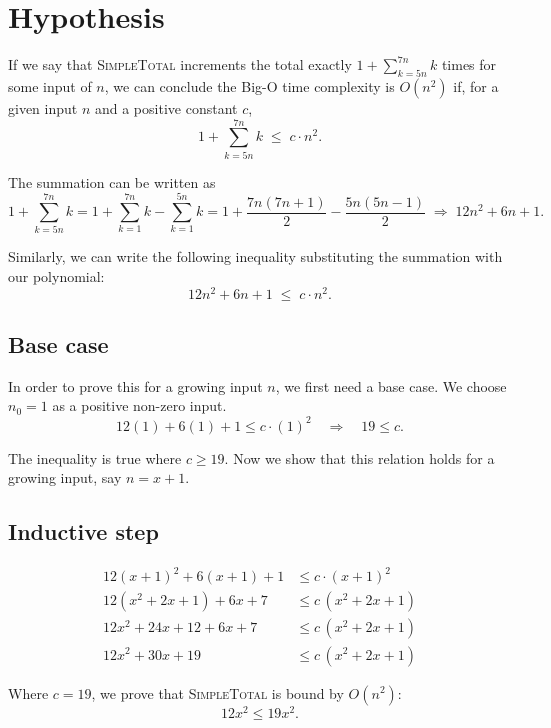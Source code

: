 \documentclass{article}
\begin{document}
\section*{Hypothesis}

If we say that \textsc{SimpleTotal} increments the total exactly
$1 + \sum_{k=5n}^{7n} k$ times for some input of $n$, we can conclude the
Big-O time complexity is $O(n^2)$ if, for a given input $n$ and a positive
constant $c$,
\[
  1 + \sum_{k=5n}^{7n} k \;\le\; c \cdot n^2.
\]

The summation can be written as
\[
  1 + \sum_{k=5n}^{7n} k
  = 1 + \sum_{k=1}^{7n} k - \sum_{k=1}^{5n} k
  = 1 + \frac{7n(7n+1)}{2} - \frac{5n(5n-1)}{2}
  \;\Rightarrow\; 12n^2 + 6n + 1.
\]

Similarly, we can write the following inequality substituting the summation
with our polynomial:
\[
  12n^2 + 6n + 1 \;\le\; c \cdot n^2.
\]

\subsection*{Base case}

In order to prove this for a growing input $n$, we first need a base case.
We choose $n_0 = 1$ as a positive non-zero input.
\[
  12(1) + 6(1) + 1 \le c \cdot (1)^2
  \quad\Longrightarrow\quad
  19 \le c.
\]

The inequality is true where $c \ge 19$. Now we show that this relation
holds for a growing input, say $n = x + 1$.

\subsection*{Inductive step}

\begin{align*}
  12(x+1)^2 + 6(x+1) + 1 &\le c \cdot (x+1)^2 \\
  12(x^2 + 2x + 1) + 6x + 7 &\le c\,(x^2 + 2x + 1) \\
  12x^2 + 24x + 12 + 6x + 7 &\le c\,(x^2 + 2x + 1) \\
  12x^2 + 30x + 19 &\le c\,(x^2 + 2x + 1)
\end{align*}

Where $c = 19$, we prove that \textsc{SimpleTotal} is bound by $O(n^2)$:
\[
  12x^2 \le 19x^2.
\]
\end{document}
